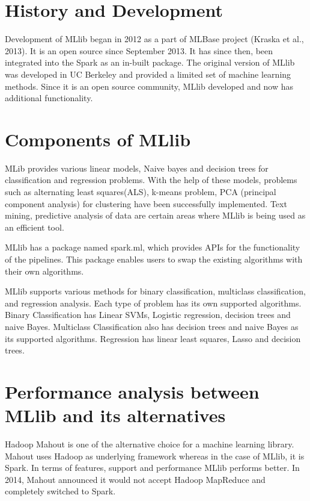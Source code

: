 \documentclass[9pt,twocolumn,twoside]{../../styles/osajnl}
\begin{document}
\section{History and Development}

Development of MLlib began in 2012 as a part of MLBase
project\cite{paper-MLBase} (Kraska et al.,
2013)\cite{www-mlbase-paper}. It is an open source since September
2013. It has since then, been integrated into the Spark as an in-built
package. The original version of MLlib was developed in UC Berkeley
and provided a limited set of machine learning methods. Since it is an
open source community, MLlib developed and now has additional
functionality.
 

\section{Components of MLlib}

MLib provides various linear models, Naive bayes\cite{www-naivebayes}
and decision trees\cite{www-decisiontrees} for classification and
regression problems. With the help of these models, problems such as
alternating least squares(ALS), k-means
problem\cite{www-kmeansproblem}, PCA (principal component
analysis)\cite{www-pca} for clustering have been successfully
implemented. Text mining, predictive analysis of data are certain
areas where MLlib is being used as an efficient tool.

MLlib has a package named spark.ml, which provides APIs for the
functionality of the pipelines. This package enables users to swap the
existing algorithms with their own algorithms\cite{MLlib-article}.

MLlib supports various methods for binary classification, multiclass
classification, and regression analysis. Each type of problem has its
own supported algorithms. Binary Classification has Linear SVMs,
Logistic regression\cite{www-logisticregression}, decision trees and
naive Bayes. Multiclass Classification also has decision trees and
naive Bayes as its supported algorithms. Regression has linear least
squares\cite{www-linearleastsquares}, Lasso\cite{www-lasso} and
decision trees.

\section{Performance analysis between MLlib and its alternatives}
Hadoop Mahout is one of the alternative choice for a machine learning
library. Mahout uses Hadoop as underlying framework whereas in the
case of MLlib, it is Spark. In terms of features, support and
performance MLlib performs better. In 2014, Mahout announced it would
not accept Hadoop MapReduce and completely switched to Spark.
\end{document}
